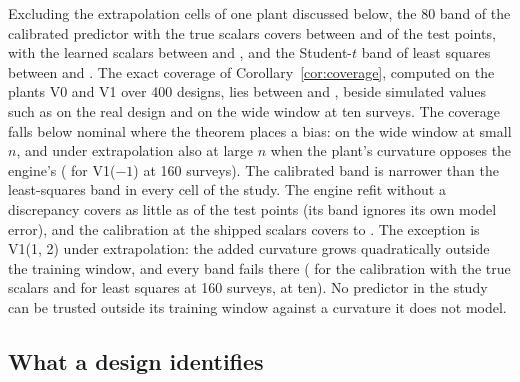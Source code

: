 Excluding the extrapolation cells of one plant discussed below, the 80\pct{} band of the calibrated predictor with the true scalars covers between
\covOrMin{} and \covOrMax{} of the test points, with the learned scalars between \covKoMin{} and \covKoMax, and the Student-$t$
band of least squares between \covLsMin{} and \covLsMax. The exact coverage of Corollary~\ref{cor:coverage}, computed on the
plants V0 and V1 over 400 designs, lies between \covExactMin{} and \covExactMax, beside simulated values such as
\covOrSimRealKw{} on the real design and \covOrSimWTenKw{} on the wide window at ten surveys. The coverage falls below nominal
where the theorem places a bias: on the wide window at small $n$, and under extrapolation also at large $n$ when the plant's
curvature opposes the engine's (\covAmXBigSim{} for V1($-1$) at 160 surveys). The calibrated band is narrower than the
least-squares band in every cell of the study. The engine refit without a discrepancy covers as little as
\covRefitMin{} of the test points (its band ignores its own model error), and the calibration at the shipped scalars covers
\covNomMin{} to \covNomMax. The exception is V1(1, 2) under extrapolation: the added curvature grows quadratically outside the
training window, and every band fails there (\covKqXOr{} for the calibration with the true scalars and \covKqXLs{} for least
squares at 160 surveys, \covKqXTenOr{} at ten). No predictor in the study can be trusted outside its training window against a
curvature it does not model.

\subsection{What a design identifies}\label{sec:results-design}

